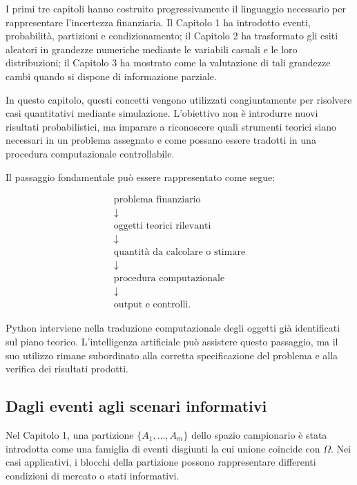 I primi tre capitoli hanno costruito progressivamente il linguaggio necessario
per rappresentare l'incertezza finanziaria. Il Capitolo 1 ha introdotto eventi,
probabilit\`{a}, partizioni e condizionamento; il Capitolo 2 ha trasformato gli
esiti aleatori in grandezze numeriche mediante le variabili casuali e le loro
distribuzioni; il Capitolo 3 ha mostrato come la valutazione di tali grandezze
cambi quando si dispone di informazione parziale.

In questo capitolo, questi concetti vengono utilizzati congiuntamente per
risolvere casi quantitativi mediante simulazione. L'obiettivo non \`{e}
introdurre nuovi risultati probabilistici, ma imparare a riconoscere quali
strumenti teorici siano necessari in un problema assegnato e come possano
essere tradotti in una procedura computazionale controllabile.

Il passaggio fondamentale pu\`{o} essere rappresentato come segue:

\[
\begin{array}{c}
\text{problema finanziario}
\\[4pt]
\downarrow
\\[4pt]
\text{oggetti teorici rilevanti}
\\[4pt]
\downarrow
\\[4pt]
\text{quantit\`{a} da calcolare o stimare}
\\[4pt]
\downarrow
\\[4pt]
\text{procedura computazionale}
\\[4pt]
\downarrow
\\[4pt]
\text{output e controlli}.
\end{array}
\]

Python interviene nella traduzione computazionale degli oggetti gi\`{a}
identificati sul piano teorico. L'intelligenza artificiale pu\`{o} assistere
questo passaggio, ma il suo utilizzo rimane subordinato alla corretta
specificazione del problema e alla verifica dei risultati prodotti.

\subsection{Dagli eventi agli scenari informativi}

Nel Capitolo 1, una partizione $\{A_{1},\ldots,A_{m}\}$ dello spazio campionario \`{e} stata introdotta come una famiglia di eventi
disgiunti la cui unione coincide con $\Omega$. Nei casi applicativi, i blocchi
della partizione possono rappresentare differenti condizioni di mercato o
stati informativi.

